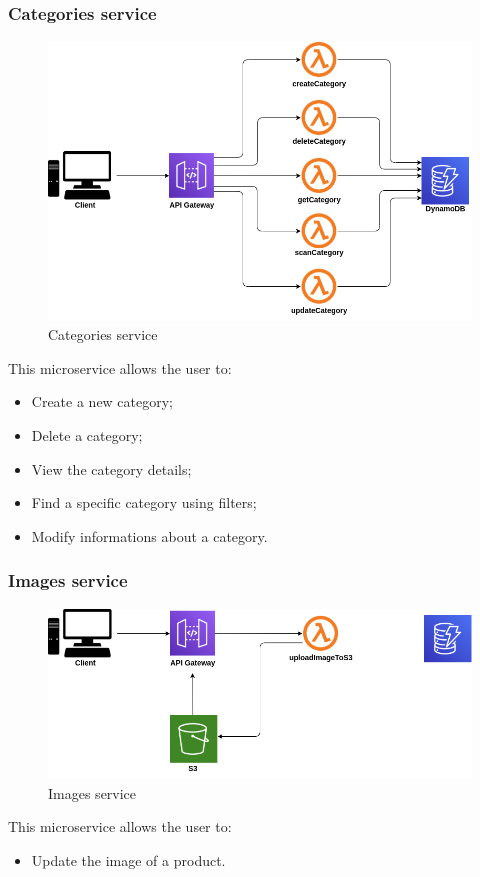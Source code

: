 \subsubsection{Categories service}
\begin{figure}[!h]
    \vspace{5px}
    \includegraphics[scale=0.5]{../../../../Images/Diagrammi/maintainerManual/categoriesService.png}
    \centering
    \caption{Categories service}
\end{figure}
This microservice allows the user to:
\begin{itemize}
    \item Create a new category;
    \item Delete a category;
    \item View the category details;
    \item Find a specific category using filters;
    \item Modify informations about a category.
\end{itemize}
\pagebreak
\subsubsection{Images service}
\begin{figure}[!h]
    \vspace{5px}
    \includegraphics[scale=0.5]{../../../../Images/Diagrammi/maintainerManual/imageService.png}
    \centering
    \caption{Images service}
\end{figure}
This microservice allows the user to:
\begin{itemize}
    \item Update the image of a product.
\end{itemize}

